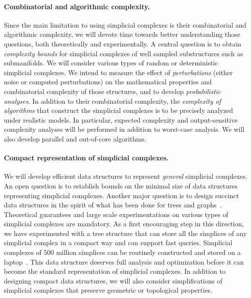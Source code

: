 \paragraph{Combinatorial and algorithmic complexity.}

Since the main limitation to using simplicial complexes is their combinatorial and algorithmic complexity, we will devote time towards better understanding those questions, both theoretically and experimentally.  %
A central question is to obtain {\em complexity bounds} for simplicial complexes of well sampled substructures such as submanifolds. We will consider various types of random or deterministic simplicial complexes.  We intend to measure the effect of {\em perturbations} (either noise or computed perturbations) on the mathematical properties and combinatorial complexity of those structures, and to develop {\em probabilistic analyses}.  In addition to their combinatorial complexity, the {\em complexity of algorithms} that construct the simplicial complexes is to be precisely analyzed under realistic models. In particular, expected complexity and output-sensitive complexity analyses will be performed in addition to worst-case analysis. %
We will also develop parallel and out-of-core algorithms.%


\paragraph{Compact representation of simplicial complexes.}  We will develop efficient data structures to represent {\em general} simplicial complexes. 
An open question is to establish bounds on the minimal size of data structures representing simplicial complexes. Another major question is to design succinct data structures
in the spirit of what has been done for trees and graphs~\cite{Ferragina:2005:SLT:1097112.1097456,Munro:2002:SRB:586840.586885}. 
 Theoretical guarantees and large scale experimentations on various
 types of simplicial complexes are mandatory. As a first encouraging
 step in this direction, we have experimented with a tree structure
 that can store all the simplices of any simplicial complex in a
 compact way and can support fast queries. Simplicial complexes of 500 million simplices can be routinely constructed and stored on a laptop~\cite{bm-dssc-2012}.  This data structure deserves  full analysis and optimization before it can become the standard representation of simplicial complexes. In addition to designing compact data structures, we will also consider simplifications of simplicial complexes that preserve geometric or topological properties.











